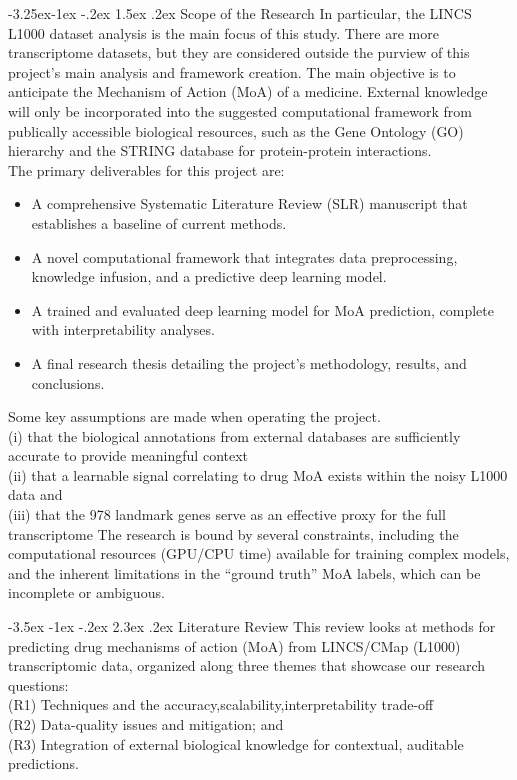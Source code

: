 \documentclass[12pt,a4paper]{article}
\makeatletter
\renewcommand\section{\@startsection{section}{1}{\z@}%
  {-3.5ex \@plus-1ex \@minus-.2ex}%
  {2.3ex \@plus.2ex}%
  {\normalfont\large\bfseries}}
\renewcommand\subsection{\@startsection{subsection}{2}{\z@}%
  {-3.25ex\@plus-1ex \@minus-.2ex}%
  {1.5ex \@plus.2ex}%
  {\normalfont\normalsize\bfseries}}
\makeatother
\begin{document}
\subsection{Scope of the Research}
In particular, the LINCS L1000 dataset analysis is the main focus of this study.  There are more transcriptome datasets, but they are considered outside the purview of this project's main analysis and framework creation. The main objective is to anticipate the Mechanism of Action (MoA) of a medicine.  External knowledge will only be incorporated into the suggested computational framework from publically accessible biological resources, such as the Gene Ontology (GO) hierarchy and the STRING database for protein-protein interactions.
\\
The primary deliverables for this project are:
\begin{itemize}
  \item A comprehensive Systematic Literature Review (SLR) manuscript that establishes a baseline of current methods.
  \item A novel computational framework that integrates data preprocessing, knowledge infusion, and a predictive deep learning model.
  \item A trained and evaluated deep learning model for MoA prediction, complete with interpretability analyses.
  \item A final research thesis detailing the project's methodology, results, and conclusions.
\end{itemize}
Some key assumptions are made when operating the project.\\
(i) that the biological annotations from external databases are sufficiently accurate to provide meaningful context\\ (ii) that a learnable signal correlating to drug MoA exists within the noisy L1000 data and\\(iii) that the 978 landmark genes serve as an effective proxy for the full transcriptome
The research is bound by several constraints, including the computational resources (GPU/CPU time) available for training complex models, and the inherent limitations in the \enquote{ground truth} MoA labels, which can be incomplete or ambiguous.

\section{Literature Review}
This review looks at methods for predicting drug mechanisms of action (MoA) from LINCS/CMap (L1000) transcriptomic data, organized along three themes that showcase our research questions: \\(R1) Techniques and the accuracy,scalability,interpretability trade-off \\ (R2) Data-quality issues and mitigation; and \\(R3) Integration of external biological knowledge for contextual, auditable predictions.
\end{document}
